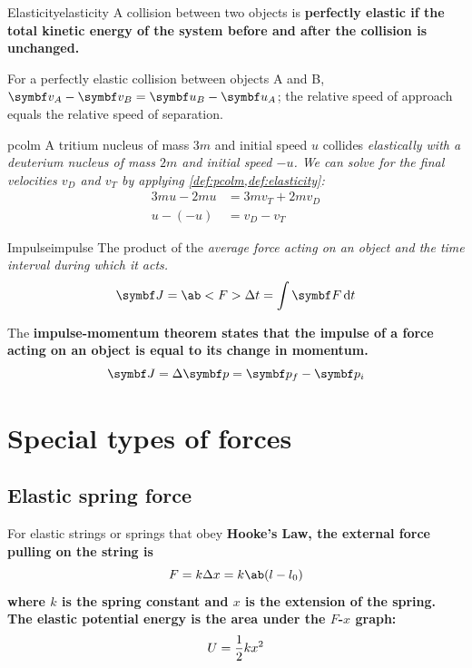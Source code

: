 \begin{definition}{Elasticity}{elasticity}
	A collision between two objects is \bf{perfectly elastic} if the total kinetic energy of the system before and after
	the collision is unchanged.
\end{definition}
For a perfectly elastic collision between objects A and B, \(\va{v}_A - \va{v}_B = \va{u}_B - \va{u}_A\); the relative
speed of approach equals the relative speed of separation.

\begin{example}{}{pcolm}
	A tritium nucleus of mass \(3m\) and initial speed \(u\) collides \it{elastically} with a deuterium nucleus
	of mass \(2m\) and initial speed \(-u\). We can solve for the final velocities \(v_D\) and \(v_T\) by applying
	\cref{def:pcolm,def:elasticity}:
	\begin{align*}
		3mu - 2mu & = 3mv_T + 2mv_D \\
		u - (-u)  & = v_D - v_T
	\end{align*}
\end{example}

\begin{definition}{Impulse}{impulse}
	The product of the \it{average force} acting on an object and the \it{time interval} during which it acts.
	\[\va{J} = \ab<F>\Delta t = \int \va{F}\odif{t}\]

	The \bf{impulse-momentum theorem} states that the impulse of a force acting on an object is equal to its change in momentum.
	\[\va{J} = \Delta \va{p} = \va{p}_f-\va{p}_i\]
\end{definition}

\section{Special types of forces}
\subsection{Elastic spring force}
For elastic strings or springs that obey \bf{Hooke's Law}, the
external force pulling on the string is
\begin{equation*}
	F = k\Delta x = k\ab(l - l_0)
\end{equation*}
where \(k\) is the \bf{spring constant} and \(x\) is the \bf{extension} of the spring.
The elastic potential energy is the area under the \(F\)-\(x\) graph:
\begin{equation*}
	U = \frac{1}{2}kx^2
\end{equation*}
